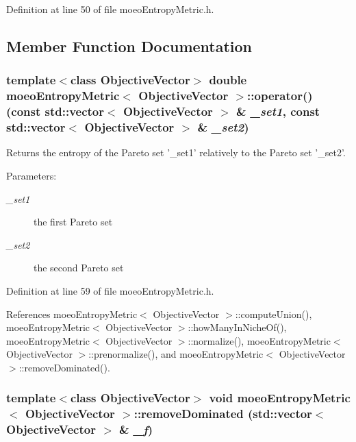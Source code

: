 Definition at line 50 of file moeo\-Entropy\-Metric.h.

\subsection{Member Function Documentation}
\subsubsection{\setlength{\rightskip}{0pt plus 5cm}template$<$class Objective\-Vector$>$ double \bf{moeo\-Entropy\-Metric}$<$ \bf{Objective\-Vector} $>$::operator() (const std::vector$<$ \bf{Objective\-Vector} $>$ \& {\em \_\-set1}, const std::vector$<$ \bf{Objective\-Vector} $>$ \& {\em \_\-set2})\hspace{0.3cm}{\tt  [inline]}}\label{classmoeoEntropyMetric_191a8cdda7873e20338e678c5a7b927b}


Returns the entropy of the Pareto set '\_\-set1' relatively to the Pareto set '\_\-set2'. 

\begin{Desc}
\item[Parameters:]
\begin{description}
\item[{\em \_\-set1}]the first Pareto set \item[{\em \_\-set2}]the second Pareto set \end{description}
\end{Desc}


Definition at line 59 of file moeo\-Entropy\-Metric.h.

References moeo\-Entropy\-Metric$<$ Objective\-Vector $>$::compute\-Union(), moeo\-Entropy\-Metric$<$ Objective\-Vector $>$::how\-Many\-In\-Niche\-Of(), moeo\-Entropy\-Metric$<$ Objective\-Vector $>$::normalize(), moeo\-Entropy\-Metric$<$ Objective\-Vector $>$::prenormalize(), and moeo\-Entropy\-Metric$<$ Objective\-Vector $>$::remove\-Dominated().
\subsubsection{\setlength{\rightskip}{0pt plus 5cm}template$<$class Objective\-Vector$>$ void \bf{moeo\-Entropy\-Metric}$<$ \bf{Objective\-Vector} $>$::remove\-Dominated (std::vector$<$ \bf{Objective\-Vector} $>$ \& {\em \_\-f})\hspace{0.3cm}{\tt  [inline, private]}}\label{classmoeoEntropyMetric_198a717fd0bab0bb91346399c1021f82}


